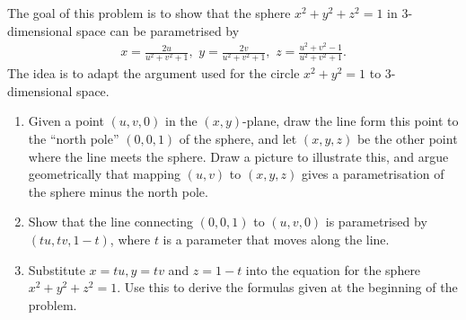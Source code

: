 \begin{exercise}{6}
The goal of this problem is to show that the sphere $x^2+y^2+z^2=1$ in 3-dimensional space can be parametrised by
\begin{align*}
    x = \frac{2u}{u^2+v^2+1},\,\, 
    y = \frac{2v}{u^2+v^2+1},\,\, 
    z = \frac{u^2+v^2-1}{u^2+v^2+1}.
\end{align*}
The idea is to adapt the argument used for the circle $x^2+y^2=1$ to 3-dimensional space.
\begin{enumerate}
    \item Given a point $(u,v,0)$ in the $(x,y)$-plane, draw the line form this point to the ``north pole'' $(0,0,1)$ of the sphere, and let $(x,y,z)$ be the other point where the line meets the sphere. 
    Draw a picture to illustrate this, and argue geometrically that mapping $(u,v)$ to $(x,y,z)$ gives a parametrisation of the sphere minus the north pole.
    \item Show that the line connecting $(0,0,1)$ to $(u,v,0)$ is parametrised by $(tu,tv,1-t)$, where $t$ is a parameter that moves along the line.
    \item Substitute $x=tu, y=tv$ and $z=1-t$ into the equation for the sphere $x^2+y^2+z^2=1$. Use this to derive the formulas given at the beginning of the problem.
\end{enumerate}
\end{exercise}
